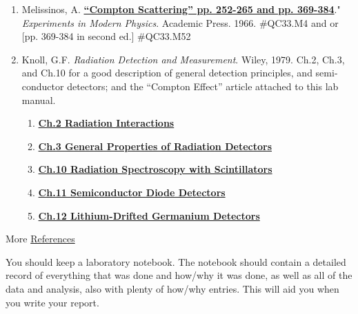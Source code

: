 \documentclass{../lab}
\begin{document}
\begin{enumerate}

    \item Melissinos, A. \href{https://drive.google.com/file/d/1aIipjSwVCA50zE-flRiX0fXz9UKq3lZS/view?usp=drive_link}{\textbf{``Compton Scattering'' pp. 252-265 and pp. 369-384}}." \emph{Experiments in Modern Physics}. Academic Press. 1966. \#QC33.M4 and or [pp. 369-384 in second ed.] \#QC33.M52

    \item Knoll, G.F. \emph{Radiation Detection and Measurement}. Wiley, 1979. Ch.2, Ch.3, and Ch.10 for a good description of general detection principles, and semi-conductor detectors; and the ``Compton Effect'' article attached to this lab manual. 
    \begin{enumerate}
    
        \item
        \href{https://drive.google.com/file/d/1OVyNDtPH2b4DAmpoF-W8SDDqO96Ps6Gr/view?usp=drive_link}{\textbf{Ch.2 Radiation Interactions}}

        \item
        \href{https://drive.google.com/file/d/1slm-rP1zll9ptP1PwxVsSA_lrpf3UMl_/view?usp=drive_link}{\textbf{Ch.3 General Properties of Radiation Detectors}}
        
        \item        \href{https://drive.google.com/file/d/1hL2bp21Cg0m2iJ34S5yGEmVo5298FAvh/view?usp=drive_link}{\textbf{Ch.10 Radiation Spectroscopy with Scintillators}}
    
        \item
        \href{https://drive.google.com/file/d/1HRslW-8lR0uusvyITW2et2T0cyuKFnZU/view?usp=drive_link}{\textbf{Ch.11 Semiconductor Diode Detectors}}
    
        \item \href{https://drive.google.com/file/d/1xjk41bithPdXHMeE1qheB1vPB_BPiiC8/view?usp=drive_link}{\textbf{Ch.12 Lithium-Drifted Germanium Detectors}}

        \end{enumerate}

\end{enumerate}

More \hyperref[sec:References]{References}

You should keep a laboratory notebook. The notebook should contain a detailed record of everything that was done and how/why it was done, as well as all of the data and analysis, also with plenty of how/why entries. This will aid you when you write your report.
\end{document}
